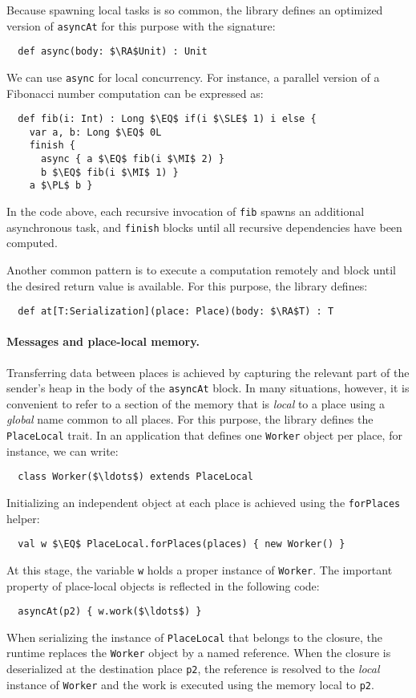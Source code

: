 Because spawning local tasks is so common, the library defines an optimized version of
\lstinline{asyncAt} for this purpose with the signature:
\begin{lstlisting}
  def async(body: $\RA$Unit) : Unit
\end{lstlisting}
We can use \lstinline{async} for local concurrency. For instance, a parallel
version of a Fibonacci number computation can be expressed as:
\begin{lstlisting}
  def fib(i: Int) : Long $\EQ$ if(i $\SLE$ 1) i else {
    var a, b: Long $\EQ$ 0L
    finish {
      async { a $\EQ$ fib(i $\MI$ 2) }
      b $\EQ$ fib(i $\MI$ 1) }
    a $\PL$ b }
\end{lstlisting}
In the code above, each recursive invocation of \lstinline{fib} spawns an
additional asynchronous task, and \lstinline{finish} blocks until all
recursive dependencies have been computed.

Another common pattern is to execute a computation remotely and block until the
desired return value is available. For this purpose, the library defines:
\begin{lstlisting}
  def at[T:Serialization](place: Place)(body: $\RA$T) : T
\end{lstlisting}

\paragraph{Messages and place-local memory.}
Transferring data between places is achieved by capturing the relevant part of
the sender's heap in the body of the \lstinline{asyncAt} block. In many
situations, however, it is convenient to refer to a section of the memory that
is \emph{local} to a place using a \emph{global} name common to all places. For this
purpose, the library defines the \lstinline{PlaceLocal} trait. In an
application that defines one \lstinline{Worker} object per place, for instance,
we can write:
\begin{lstlisting}
  class Worker($\ldots$) extends PlaceLocal
\end{lstlisting}
Initializing an independent object at each place is achieved using the
\lstinline{forPlaces} helper:
\begin{lstlisting}
  val w $\EQ$ PlaceLocal.forPlaces(places) { new Worker() }
\end{lstlisting}
At this stage, the variable \lstinline{w} holds a proper instance of
\lstinline{Worker}. The important property of place-local objects is reflected
in the following code:
\begin{lstlisting}
  asyncAt(p2) { w.work($\ldots$) }
\end{lstlisting}
When serializing the instance of \lstinline{PlaceLocal} that belongs to the
closure, the runtime replaces the \lstinline{Worker} object by a named
reference. When the closure is deserialized at the destination place
\lstinline{p2}, the reference is resolved to the \emph{local} instance of
\lstinline{Worker} and the work is executed using the memory local to
\lstinline{p2}.

